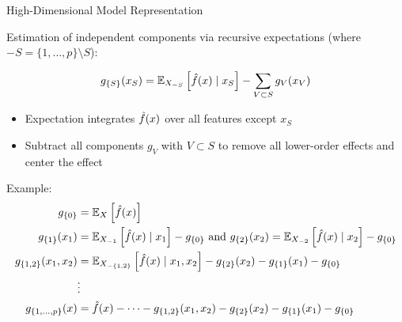 \documentclass[11pt,compress,t,notes=noshow, aspectratio=169, xcolor=table]{beamer}
\newcommand{\open}{\{}
\newcommand{\close}{\}}
\begin{document}
\begin{frame}{High-Dimensional Model Representation}

Estimation of independent components via recursive expectations (where $-S = \{1, \ldots, p \} \setminus S$):

$$g_{\open S \close}(x_S) = \mathbb{E}_{X_{-S}}\left[\fh(x) \; \vert  \; x_S \right] - \sum_{V \subset S} g_V(x_V)$$

\begin{itemize}
    \item Expectation integrates $\fh(x)$ over all features except $x_S$
    \item Subtract all components $g_V$ with $V \subset S$ to remove all lower-order effects and center the effect
\end{itemize}
\pause
Example:
\begin{align*}
 g_{\open  0  \close} &= \mathbb{E}_X\left[\fh(x)\right] \\
 g_{\open 1 \close}(x_1) &= \mathbb{E}_{X_{-1}}\left[\fh(x) \; \vert  \; x_1 \right] - g_{\open  0  \close} \text{ and } g_{\open 2 \close}(x_2) = \mathbb{E}_{X_{-2}}\left[\fh(x) \; \vert  \; x_2 \right] - g_{\open  0  \close}  \\
 g_{\open 1, 2 \close}(x_1, x_2) &= \mathbb{E}_{X_{-\open 1,2 \close}}\left[\fh(x) \; \vert \; x_1, x_2 \right] - g_{\open 2 \close}(x_2) - g_{\open 1 \close}(x_1) - g_{\open  0  \close}\\
 &\vdots \\
 g_{\open 1, \dots, p \close}(x) &= \fh(x) - \dots - g_{\open 1, 2 \close}(x_1, x_2) %
 - g_{\open 2 \close}(x_2) - g_{\open 1 \close}(x_1) - g_{\open  0  \close}\\
\end{align*}

\end{frame}
\end{document}
